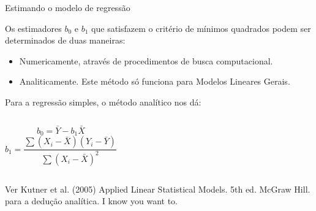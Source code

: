 \documentclass{beamer}\usepackage[]{graphicx}\usepackage[]{color}
\begin{document}
\begin{frame}{Estimando o modelo de regressão}

Os estimadores $b_0$ e $b_1$ que satisfazem o critério de mínimos quadrados podem ser determinados de duas maneiras: \pause
\vfill
\begin{itemize}
  \item Numericamente, através de procedimentos de busca  computacional.
  \vfill
  \item Analiticamente. Este método só funciona para Modelos Lineares Gerais. 
\end{itemize}
\vfill \pause
Para a regressão simples, o método analítico nos dá:
\vfill
\begin{columns}[c]
\begin{equation*}
b_0 = \bar Y - b_1 \bar X
\end{equation*}
\begin{equation*}
b_1 = \frac{\sum(X_i - \bar X)(Y_i - \bar Y)}{\sum(X_i - \bar X)^2}
\end{equation*}  
\end{columns}  
\vfill
\tiny{Ver Kutner et al. (2005) Applied Linear Statistical Models. 5th ed. McGraw Hill. para a dedução analítica. I know you want to.}

\end{frame}
\end{document}
